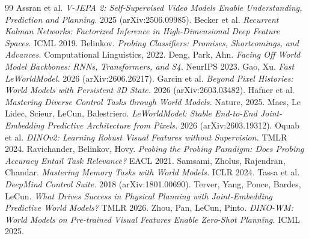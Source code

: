 \begin{thebibliography}{99}\small
{} Assran et al. \emph{V-JEPA 2: Self-Supervised Video Models Enable Understanding, Prediction and Planning.} 2025 (arXiv:2506.09985).
 Becker et al. \emph{Recurrent Kalman Networks: Factorized Inference in High-Dimensional Deep Feature Spaces.} ICML 2019.
 Belinkov. \emph{Probing Classifiers: Promises, Shortcomings, and Advances.} Computational Linguistics, 2022.
 Deng, Park, Ahn. \emph{Facing Off World Model Backbones: RNNs, Transformers, and S4.} NeurIPS 2023.
 Gao, Xu. \emph{Fast LeWorldModel.} 2026 (arXiv:2606.26217).
 Garcin et al. \emph{Beyond Pixel Histories: World Models with Persistent 3D State.} 2026 (arXiv:2603.03482).
 Hafner et al. \emph{Mastering Diverse Control Tasks through World Models.} Nature, 2025.
 Maes, Le Lidec, Scieur, LeCun, Balestriero. \emph{LeWorldModel: Stable End-to-End Joint-Embedding Predictive Architecture from Pixels.} 2026 (arXiv:2603.19312).
 Oquab et al. \emph{DINOv2: Learning Robust Visual Features without Supervision.} TMLR 2024.
 Ravichander, Belinkov, Hovy. \emph{Probing the Probing Paradigm: Does Probing Accuracy Entail Task Relevance?} EACL 2021.
 Samsami, Zholus, Rajendran, Chandar. \emph{Mastering Memory Tasks with World Models.} ICLR 2024.
 Tassa et al. \emph{DeepMind Control Suite.} 2018 (arXiv:1801.00690).
 Terver, Yang, Ponce, Bardes, LeCun. \emph{What Drives Success in Physical Planning with Joint-Embedding Predictive World Models?} TMLR 2026.
 Zhou, Pan, LeCun, Pinto. \emph{DINO-WM: World Models on Pre-trained Visual Features Enable Zero-Shot Planning.} ICML 2025.
\end{thebibliography}
